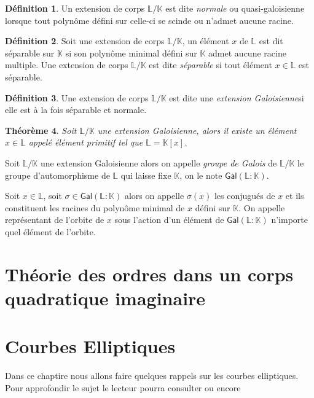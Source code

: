 \documentclass[10pt,a4paper]{book}
\theoremstyle{plain}
\newtheorem{thm}{Théorème}[chapter]
\theoremstyle{definition}
\theoremstyle{definition}
\theoremstyle{definition}
\theoremstyle{definition}
\newtheorem{defi}[thm]{Définition}
\theoremstyle{remark}
\theoremstyle{remark}
\theoremstyle{definition}
\begin{document}
\begin{defi}
Un extension de corps $\mathbb{L}/\mathbb{K}$ est dite \emph{normale} ou 
quasi-galoisienne lorsque tout polynôme défini sur celle-ci se scinde ou 
n'admet aucune racine.
\end{defi}

\begin{defi}
Soit une extension de corps $\mathbb{L}/\mathbb{K}$, un élément $x$ de 
$\mathbb{L}$ est dit séparable sur $\mathbb{K}$ si son polynôme minimal défini
sur $\mathbb{K}$ admet aucune racine multiple. Une extension de corps 
$\mathbb{L}/\mathbb{K}$ est dite \emph{séparable} si tout élément $x \in 
\mathbb{L}$ est séparable.
\end{defi}

\begin{defi}
Une extension de corps $\mathbb{L}/\mathbb{K}$ est dite une \emph{extension 
Galoisienne}si elle est à la fois séparable et normale.
\end{defi}

\begin{thm}
Soit $\mathbb{L}/\mathbb{K}$ une extension Galoisienne, alors il existe un 
élément $x \in \mathbb{L}$ appelé \emph{élément primitif} tel que $\mathbb{L}=\mathbb{K}[x]$. 
\end{thm}

Soit $\mathbb{L}/\mathbb{K}$ une extension Galoisienne alors on appelle 
\emph{groupe de Galois} de $\mathbb{L}/\mathbb{K}$ le groupe d'automorphisme de
 $\mathbb{L}$ qui laisse fixe $\mathbb{K}$, on le note $\mathsf{Gal}(\mathbb{L}:
 \mathbb{K})$.
 
 Soit $x \in \mathbb{L}$, soit $\sigma \in \mathsf{Gal}(\mathbb{L}:\mathbb{K})$
 alors on appelle $\sigma(x)$ les conjugués de $x$ et ils constituent les 
 racines du polynôme minimal de $x$ défini sur $\mathbb{K}$. On appelle 
 représentant de l'orbite de $x$ sous l'action d'un élément de $\mathsf{Gal}
 (\mathbb{L}:\mathbb{K})$ n'importe quel élément de l'orbite.

\section{Théorie des ordres dans un corps quadratique imaginaire}

\section{Courbes Elliptiques}
Dans ce chaptire nous allons faire quelques rappels sur les courbes elliptiques. Pour approfondir le sujet le lecteur pourra consulter \cite{Silv1} ou encore \cite{Washington2008}
\end{document}
